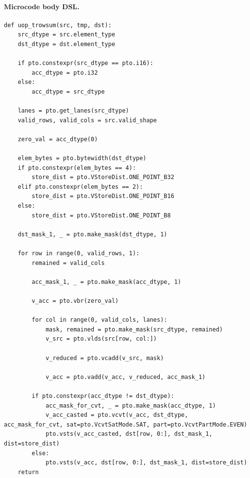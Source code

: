 \paragraph{Microcode body DSL.}
\begin{lstlisting}[style=ptocode]
def uop_trowsum(src, tmp, dst):
    src_dtype = src.element_type
    dst_dtype = dst.element_type

    if pto.constexpr(src_dtype == pto.i16):
        acc_dtype = pto.i32
    else:
        acc_dtype = src_dtype

    lanes = pto.get_lanes(src_dtype)
    valid_rows, valid_cols = src.valid_shape

    zero_val = acc_dtype(0)

    elem_bytes = pto.bytewidth(dst_dtype)
    if pto.constexpr(elem_bytes == 4):
        store_dist = pto.VStoreDist.ONE_POINT_B32
    elif pto.constexpr(elem_bytes == 2):
        store_dist = pto.VStoreDist.ONE_POINT_B16
    else:
        store_dist = pto.VStoreDist.ONE_POINT_B8

    dst_mask_1, _ = pto.make_mask(dst_dtype, 1)

    for row in range(0, valid_rows, 1):
        remained = valid_cols

        acc_mask_1, _ = pto.make_mask(acc_dtype, 1)

        v_acc = pto.vbr(zero_val)

        for col in range(0, valid_cols, lanes):
            mask, remained = pto.make_mask(src_dtype, remained)
            v_src = pto.vlds(src[row, col:])

            v_reduced = pto.vcadd(v_src, mask)

            v_acc = pto.vadd(v_acc, v_reduced, acc_mask_1)

        if pto.constexpr(acc_dtype != dst_dtype):
            acc_mask_for_cvt, _ = pto.make_mask(acc_dtype, 1)
            v_acc_casted = pto.vcvt(v_acc, dst_dtype, acc_mask_for_cvt, sat=pto.VcvtSatMode.SAT, part=pto.VcvtPartMode.EVEN)
            pto.vsts(v_acc_casted, dst[row, 0:], dst_mask_1, dist=store_dist)
        else:
            pto.vsts(v_acc, dst[row, 0:], dst_mask_1, dist=store_dist)
    return
\end{lstlisting}
\Needspace{0.50\textheight}
